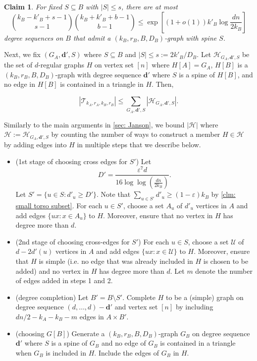 \documentclass[11pt]{article}
\newcommand{\eps}{\varepsilon}
\theoremstyle{plain}
\newtheorem{claim}{Claim}[thm]
\begin{document}
\begin{claim}\label{clm: num deg sequences}
    For fixed $S \subseteq B$ with $|S| \leq s$, there are at most 
    \[
   \binom{k_B-k'_B + s - 1}{s-1}\binom{k_B + k'_B + b - 1}{b-1} \leq {  \exp\left[(1 + o(1))k'_B\log\frac{dn}{2k_B}\right]}
    \]
    degree sequences on $B$ that admit a $(k_B, r_B, B, D_B)$-graph with spine $S$.
\end{claim}

Next, we fix $(G_A, \mathbf d', S)$ where $S \subseteq B$ and $|S| \leq s:=2k'_B/D_B$. Let $\mathcal H_{G_A, \mathbf d', S}$ be the set of $d$-regular graphs $H$ on vertex set $[n]$ where $H[A] = G_A$, $H[B]$ is a $(k_B, r_B, B, D_B)$-graph with degree sequence $\mathbf d'$ where $S$ is a spine of $H[B]$, and no edge in $H[B]$ is contained in a triangle in $H$.  Then,

\begin{equation}\label{eq: T leq H small torso}
    |\mathcal T_{k_A, r_A, k_B, r_B}| \leq \sum_{G_A, \mathbf d', S} |\mathcal H_{G_A, \mathbf d', S}|.
\end{equation}


Similarly to the main arguments in \cref{sec: Janson}, we bound $|\mathcal H |$ where $\mathcal H :=\mathcal H_{G_A, \mathbf d', S}$ by counting the number of ways to construct a member $H\in\mathcal{H}$ by adding edges into $H$ in multiple steps that we describe below.


\begin{itemize}
    
    \item[1.](1st stage of choosing cross edges for $S'$) Let 
    \[
    D' = \frac{\varepsilon^7d}{16\log\log\left(\frac{dn}{2k_B}\right)}.
    \]
    Let $S' = \{u \in S \mathrel : d'_u \geq D'\}$. Note that $\sum_{u \in S'}d'_u \geq (1 - \eps)k_B$ by \cref{clm: small torso subset}. For each $u \in S'$, choose a set $A_u$ of $d'_u$ vertices in $A$ and add edges $\{ux \mathrel : x \in  A_u\}$ to $H$. Moreover, ensure that no vertex in $H$ has degree more than $d$.
    \item[2.](2nd stage of choosing cross-edges for $S'$) For each $u \in S$, choose a set $\mathcal U$ of $d - 2d'(u)$ vertices in $A$ and add edges $\{ux \mathrel : x \in \mathcal U\}$ to $H$. Moreover, ensure that $H$ is simple (i.e. no edge that was already included in $H$ is chosen to be added) and no vertex in $H$ has degree more than $d$. Let $m$ denote the number of edges added in steps 1 and 2.
    \item[3.](degree completion) Let $B' = B \setminus S'$. Complete $H$ to be a (simple) graph on degree sequence $(d,\ldots, d) - \mathbf d'$ and vertex set $[n]$ by including $dn/2 - k_A - k_B - m$ edges in $A \times B'$.
    \item[4.](choosing $G[B]$) Generate a $(k_B, r_B, B, D_B)$-graph $G_B$ on degree sequence $\mathbf d'$ where $S$ is a spine of $G_B$ and no edge of $G_B$ is contained in a triangle when $G_B$ is included in $H$. Include the edges of $G_B$ in $H$.
\end{itemize}
\end{document}
